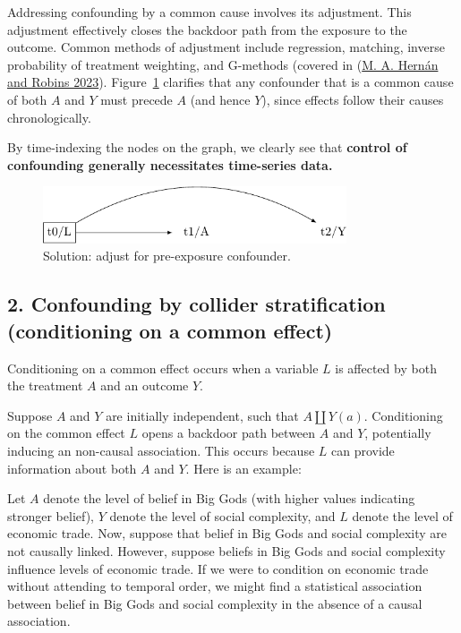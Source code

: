 \documentclass[
  singlecolumn]{report}
\begin{document}
Addressing confounding by a common cause involves its adjustment. This
adjustment effectively closes the backdoor path from the exposure to the
outcome. Common methods of adjustment include regression, matching,
inverse probability of treatment weighting, and G-methods (covered in
(\protect\hyperlink{ref-hernuxe1n2023a}{M. A. Hernán and Robins 2023}).
Figure~\ref{fig-dag-common-cause-solution} clarifies that any confounder
that is a common cause of both \(A\) and \(Y\) must precede \(A\) (and
hence \(Y\)), since effects follow their causes chronologically.

By time-indexing the nodes on the graph, we clearly see that
\textbf{control of confounding generally necessitates time-series data.}

\begin{figure}

{\centering \includegraphics[width=0.8\textwidth,height=\textheight]{causal-dags_files/figure-pdf/fig-dag-common-cause-solution-1.pdf}

}

\caption{\label{fig-dag-common-cause-solution}Solution: adjust for
pre-exposure confounder.}

\end{figure}

\hypertarget{confounding-by-collider-stratification-conditioning-on-a-common-effect}{%
\subsection{2. Confounding by collider stratification (conditioning on a
common
effect)}\label{confounding-by-collider-stratification-conditioning-on-a-common-effect}}

Conditioning on a common effect occurs when a variable \(L\) is affected
by both the treatment \(A\) and an outcome \(Y\).

Suppose \(A\) and \(Y\) are initially independent, such that
\(A \coprod Y(a)\). Conditioning on the common effect \(L\) opens a
backdoor path between \(A\) and \(Y\), potentially inducing an
non-causal association. This occurs because \(L\) can provide
information about both \(A\) and \(Y\). Here is an example:

Let \(A\) denote the level of belief in Big Gods (with higher values
indicating stronger belief), \(Y\) denote the level of social
complexity, and \(L\) denote the level of economic trade. Now, suppose
that belief in Big Gods and social complexity are not causally linked.
However, suppose beliefs in Big Gods and social complexity influence
levels of economic trade. If we were to condition on economic trade
without attending to temporal order, we might find a statistical
association between belief in Big Gods and social complexity in the
absence of a causal association.
\end{document}
